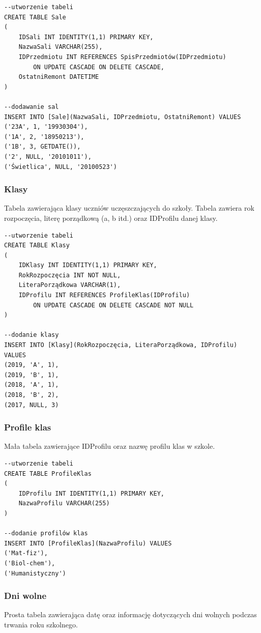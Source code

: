 \documentclass[60pt]{article}
\begin{document}
\begin{verbatim}
--utworzenie tabeli
CREATE TABLE Sale
(
    IDSali INT IDENTITY(1,1) PRIMARY KEY,
    NazwaSali VARCHAR(255),
    IDPrzedmiotu INT REFERENCES SpisPrzedmiotów(IDPrzedmiotu) 
        ON UPDATE CASCADE ON DELETE CASCADE,
    OstatniRemont DATETIME
)

--dodawanie sal
INSERT INTO [Sale](NazwaSali, IDPrzedmiotu, OstatniRemont) VALUES
('23A', 1, '19930304'),
('1A', 2, '18950213'),
('1B', 3, GETDATE()),
('2', NULL, '20101011'),
('Świetlica', NULL, '20100523')
\end{verbatim}

 \subsubsection{Klasy}
Tabela zawierająca klasy uczniów uczęszczających do szkoły. Tabela zawiera rok rozpoczęcia, literę porządkową (a, b itd.) oraz IDProfilu danej klasy.
 
\begin{verbatim}
--utworzenie tabeli
CREATE TABLE Klasy
(
    IDKlasy INT IDENTITY(1,1) PRIMARY KEY,
    RokRozpoczęcia INT NOT NULL,
    LiteraPorządkowa VARCHAR(1),
    IDProfilu INT REFERENCES ProfileKlas(IDProfilu) 
        ON UPDATE CASCADE ON DELETE CASCADE NOT NULL
)

--dodanie klasy
INSERT INTO [Klasy](RokRozpoczęcia, LiteraPorządkowa, IDProfilu) VALUES
(2019, 'A', 1),
(2019, 'B', 1),
(2018, 'A', 1),
(2018, 'B', 2),
(2017, NULL, 3)
\end{verbatim}

 \subsubsection{Profile klas}
Mała tabela zawierające IDProfilu oraz nazwę profilu klas w szkole.
 
\begin{verbatim}
--utworzenie tabeli
CREATE TABLE ProfileKlas
(
    IDProfilu INT IDENTITY(1,1) PRIMARY KEY,
    NazwaProfilu VARCHAR(255)
)

--dodanie profilów klas
INSERT INTO [ProfileKlas](NazwaProfilu) VALUES
('Mat-fiz'),
('Biol-chem'),
('Humanistyczny')
\end{verbatim}

 \subsubsection{Dni wolne}
Prosta tabela zawierająca datę oraz informację dotyczących dni wolnych podczas trwania roku szkolnego.
 
\end{document}
